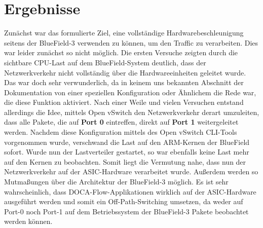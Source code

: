 \section{Ergebnisse}
Zunächst war das formulierte Ziel, eine vollständige Hardwarebeschleunigung seitens der BlueField-3 verwenden zu können, um den Traffic zu verarbeiten. Dies war leider zunächst so nicht möglich. Die ersten Versuche zeigten durch die sichtbare CPU-Last auf dem BlueField-System deutlich, dass der Netzwerkverkehr nicht vollständig über die Hardwareeinheiten geleitet wurde. Das war doch sehr verwunderlich, da in keinem uns bekannten Abschnitt der Dokumentation von einer speziellen Konfiguration oder Ähnlichem die Rede war, die diese Funktion aktiviert. Nach einer Weile und vielen Versuchen entstand allerdings die Idee, mittels Open vSwitch den Netzwerkverkehr derart umzuleiten, dass alle Pakete, die auf \textbf{Port 0} eintreffen, direkt auf \textbf{Port 1} weitergeleitet werden. Nachdem diese Konfiguration mittels des Open vSwitch CLI-Tools vorgenommen wurde, verschwand die Last auf den ARM-Kernen der BlueField sofort. Wurde nun der Lastverteiler gestartet, so war ebenfalls keine Last mehr auf den Kernen zu beobachten. Somit liegt die Vermutung nahe, dass nun der Netzwerkverkehr auf der ASIC-Hardware verarbeitet wurde. Außerdem werden so Mutmaßungen über die Architektur der BlueField-3 möglich. Es ist sehr wahrscheinlich, dass DOCA-Flow-Applikationen wirklich auf der ASIC-Hardware ausgeführt werden und somit ein Off-Path-Switching umsetzen, da weder auf Port-0 noch Port-1 auf dem Betriebssystem der BlueField-3 Pakete beobachtet werden können. 
